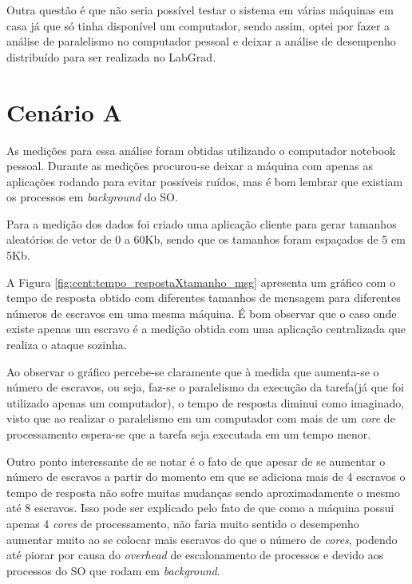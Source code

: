 \documentclass[
	12pt,				%
    oneside,			%
	a4paper,			%
	english,			%
	brazil,				%
	]{abntex2}
\begin{document}
Outra questão é que não seria possível testar o sistema em várias máquinas em casa já que só tinha disponível um computador, sendo assim, optei por fazer a análise de paralelismo no computador pessoal e deixar a análise de desempenho distribuído para ser realizada no LabGrad.

\section{Cenário A}

As medições para essa análise foram obtidas utilizando o computador notebook pessoal. Durante as medições procurou-se deixar
a máquina com apenas as aplicações rodando para evitar possíveis ruídos, mas é bom lembrar que existiam os processos em \textit{background} do SO. 

Para a medição dos dados foi criado uma aplicação cliente para gerar tamanhos aleatórios de vetor de 0 a 60Kb, sendo que os
tamanhos foram espaçados de 5 em 5Kb.

A Figura \ref{fig:cent:tempo_respostaXtamanho_msg} apresenta um gráfico com o tempo de resposta obtido com diferentes tamanhos de mensagem para diferentes números de escravos em uma mesma máquina. É bom observar que o caso onde existe apenas um escravo é a medição obtida com uma aplicação centralizada que realiza o ataque sozinha.

Ao observar o gráfico percebe-se claramente que à medida que aumenta-se o número de escravos, ou seja, faz-se o paralelismo da 
execução da tarefa(já que foi utilizado apenas um computador), o tempo de resposta diminui como imaginado, visto que ao
realizar o paralelismo em um computador com mais de um \textit{core} de processamento espera-se que a tarefa seja executada
em um tempo menor.

Outro ponto interessante de se notar é o fato de que apesar de se aumentar o número de escravos a partir do momento em que se adiciona mais de 4 escravos o tempo de resposta não sofre muitas mudanças sendo aproximadamente o mesmo até 8 escravos. Isso
pode ser explicado pelo fato de que como a máquina possui apenas 4 \textit{cores} de processamento, não faria muito sentido o desempenho aumentar muito ao se colocar mais escravos do que o número de \textit{cores}, podendo até piorar por causa do \textit{overhead} de escalonamento de processos e devido aos processos do SO que rodam em \textit{background}.
\end{document}

